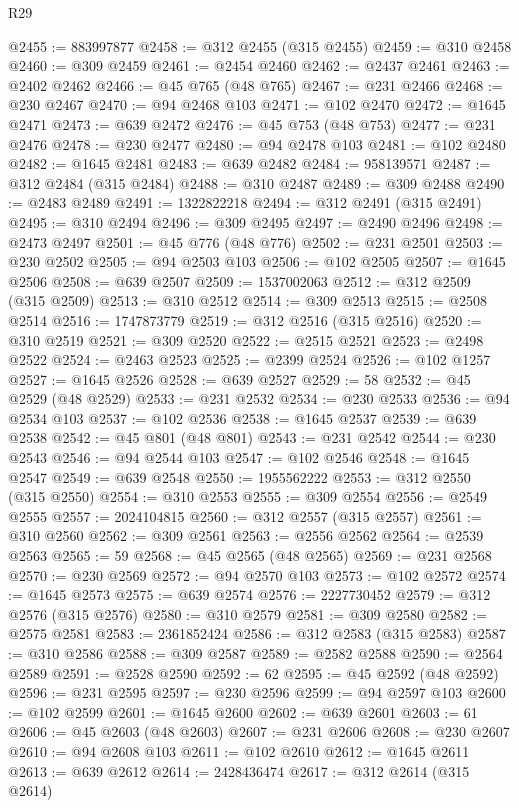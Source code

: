 \begin{lexlean}{R29}
\begin{coremodule}
@2455 := 883997877
@2458 := @312 @2455 (@315 @2455)
@2459 := @310 @2458
@2460 := @309 @2459
@2461 := @2454 @2460
@2462 := @2437 @2461
@2463 := @2402 @2462
@2466 := @45 @765 (@48 @765)
@2467 := @231 @2466
@2468 := @230 @2467
@2470 := @94 @2468 @103
@2471 := @102 @2470
@2472 := @1645 @2471
@2473 := @639 @2472
@2476 := @45 @753 (@48 @753)
@2477 := @231 @2476
@2478 := @230 @2477
@2480 := @94 @2478 @103
@2481 := @102 @2480
@2482 := @1645 @2481
@2483 := @639 @2482
@2484 := 958139571
@2487 := @312 @2484 (@315 @2484)
@2488 := @310 @2487
@2489 := @309 @2488
@2490 := @2483 @2489
@2491 := 1322822218
@2494 := @312 @2491 (@315 @2491)
@2495 := @310 @2494
@2496 := @309 @2495
@2497 := @2490 @2496
@2498 := @2473 @2497
@2501 := @45 @776 (@48 @776)
@2502 := @231 @2501
@2503 := @230 @2502
@2505 := @94 @2503 @103
@2506 := @102 @2505
@2507 := @1645 @2506
@2508 := @639 @2507
@2509 := 1537002063
@2512 := @312 @2509 (@315 @2509)
@2513 := @310 @2512
@2514 := @309 @2513
@2515 := @2508 @2514
@2516 := 1747873779
@2519 := @312 @2516 (@315 @2516)
@2520 := @310 @2519
@2521 := @309 @2520
@2522 := @2515 @2521
@2523 := @2498 @2522
@2524 := @2463 @2523
@2525 := @2399 @2524
@2526 := @102 @1257
@2527 := @1645 @2526
@2528 := @639 @2527
@2529 := 58
@2532 := @45 @2529 (@48 @2529)
@2533 := @231 @2532
@2534 := @230 @2533
@2536 := @94 @2534 @103
@2537 := @102 @2536
@2538 := @1645 @2537
@2539 := @639 @2538
@2542 := @45 @801 (@48 @801)
@2543 := @231 @2542
@2544 := @230 @2543
@2546 := @94 @2544 @103
@2547 := @102 @2546
@2548 := @1645 @2547
@2549 := @639 @2548
@2550 := 1955562222
@2553 := @312 @2550 (@315 @2550)
@2554 := @310 @2553
@2555 := @309 @2554
@2556 := @2549 @2555
@2557 := 2024104815
@2560 := @312 @2557 (@315 @2557)
@2561 := @310 @2560
@2562 := @309 @2561
@2563 := @2556 @2562
@2564 := @2539 @2563
@2565 := 59
@2568 := @45 @2565 (@48 @2565)
@2569 := @231 @2568
@2570 := @230 @2569
@2572 := @94 @2570 @103
@2573 := @102 @2572
@2574 := @1645 @2573
@2575 := @639 @2574
@2576 := 2227730452
@2579 := @312 @2576 (@315 @2576)
@2580 := @310 @2579
@2581 := @309 @2580
@2582 := @2575 @2581
@2583 := 2361852424
@2586 := @312 @2583 (@315 @2583)
@2587 := @310 @2586
@2588 := @309 @2587
@2589 := @2582 @2588
@2590 := @2564 @2589
@2591 := @2528 @2590
@2592 := 62
@2595 := @45 @2592 (@48 @2592)
@2596 := @231 @2595
@2597 := @230 @2596
@2599 := @94 @2597 @103
@2600 := @102 @2599
@2601 := @1645 @2600
@2602 := @639 @2601
@2603 := 61
@2606 := @45 @2603 (@48 @2603)
@2607 := @231 @2606
@2608 := @230 @2607
@2610 := @94 @2608 @103
@2611 := @102 @2610
@2612 := @1645 @2611
@2613 := @639 @2612
@2614 := 2428436474
@2617 := @312 @2614 (@315 @2614)

\end{coremodule}
\end{lexlean}
